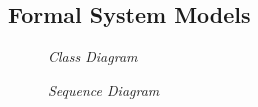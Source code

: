 \clearpage
\subsection{Formal System Models}
\label{appendix:models}

\begin{figure}[!ht]
\centering
{}
\caption{\em Class Diagram}
\end{figure}

\begin{figure}[!ht]
\centering
{}
\caption{\em Sequence Diagram}
\end{figure}

